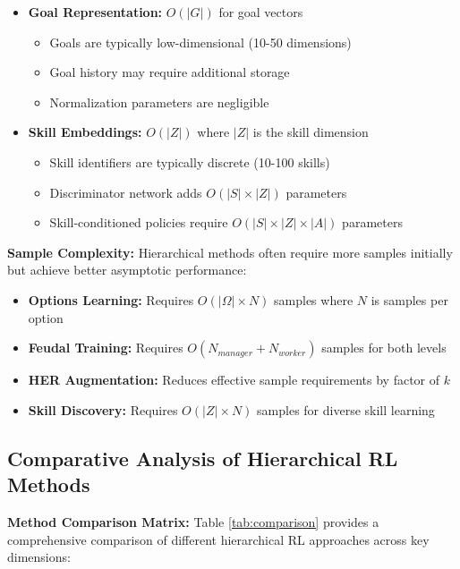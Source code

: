 \documentclass[12pt]{article}
\begin{document}
{{\begin{itemize}
    \item \textbf{Goal Representation:} $O(|G|)$ for goal vectors
    \begin{itemize}
        \item Goals are typically low-dimensional (10-50 dimensions)
        \item Goal history may require additional storage
        \item Normalization parameters are negligible
    \end{itemize}
    
    \item \textbf{Skill Embeddings:} $O(|Z|)$ where $|Z|$ is the skill dimension
        \begin{itemize}
        \item Skill identifiers are typically discrete (10-100 skills)
        \item Discriminator network adds $O(|S| \times |Z|)$ parameters
        \item Skill-conditioned policies require $O(|S| \times |Z| \times |A|)$ parameters
    \end{itemize}
        \end{itemize}
        
\textbf{Sample Complexity:}
Hierarchical methods often require more samples initially but achieve better asymptotic performance:

        \begin{itemize}
    \item \textbf{Options Learning:} Requires $O(|\Omega| \times N)$ samples where $N$ is samples per option
    \item \textbf{Feudal Training:} Requires $O(N_{manager} + N_{worker})$ samples for both levels
    \item \textbf{HER Augmentation:} Reduces effective sample requirements by factor of $k$
    \item \textbf{Skill Discovery:} Requires $O(|Z| \times N)$ samples for diverse skill learning
        \end{itemize}
        
\subsection{Comparative Analysis of Hierarchical RL Methods}

\textbf{Method Comparison Matrix:}
Table \ref{tab:comparison} provides a comprehensive comparison of different hierarchical RL approaches across key dimensions:

}}
\end{document}

